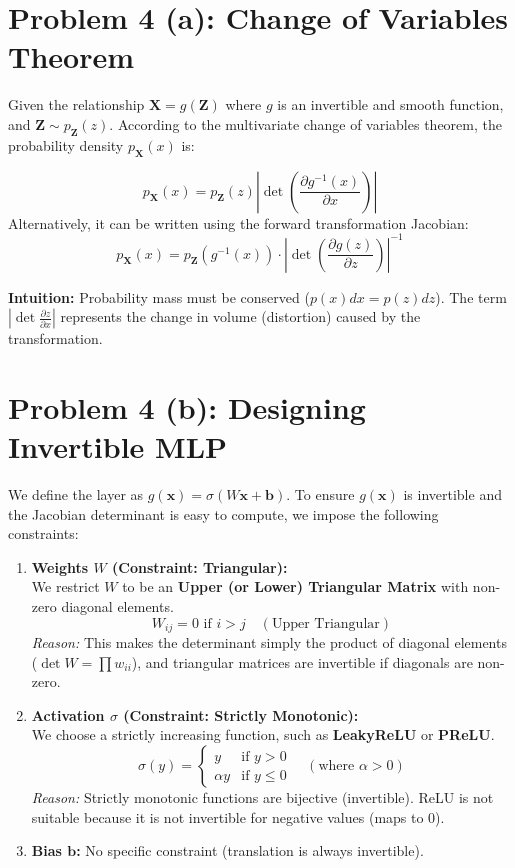 \documentclass[12pt]{article}
\begin{document}
\section*{Problem 4 (a): Change of Variables Theorem}

Given the relationship $\mathbf{X} = g(\mathbf{Z})$ where $g$ is an invertible and smooth function, and $\mathbf{Z} \sim p_{\mathbf{Z}}(z)$.
According to the multivariate change of variables theorem, the probability density $p_{\mathbf{X}}(x)$ is:

\[
    p_{\mathbf{X}}(x) = p_{\mathbf{Z}}(z) \left| \det \left( \frac{\partial g^{-1}(x)}{\partial x} \right) \right|
\]
Alternatively, it can be written using the forward transformation Jacobian:
\[
    p_{\mathbf{X}}(x) = p_{\mathbf{Z}}(g^{-1}(x)) \cdot \left| \det \left( \frac{\partial g(z)}{\partial z} \right) \right|^{-1}
\]

\textbf{Intuition:}
Probability mass must be conserved ($p(x)dx = p(z)dz$). The term $\left| \det \frac{\partial z}{\partial x} \right|$ represents the change in volume (distortion) caused by the transformation.

\section*{Problem 4 (b): Designing Invertible MLP}

We define the layer as $g(\mathbf{x}) = \sigma(W\mathbf{x} + \mathbf{b})$. To ensure $g(\mathbf{x})$ is invertible and the Jacobian determinant is easy to compute, we impose the following constraints:

\begin{enumerate}
    \item \textbf{Weights $W$ (Constraint: Triangular):} \\
    We restrict $W$ to be an \textbf{Upper (or Lower) Triangular Matrix} with non-zero diagonal elements.
    \[
        W_{ij} = 0 \text{ if } i > j \quad (\text{Upper Triangular})
    \]
    \textit{Reason:} This makes the determinant simply the product of diagonal elements ($\det W = \prod w_{ii}$), and triangular matrices are invertible if diagonals are non-zero.

    \item \textbf{Activation $\sigma$ (Constraint: Strictly Monotonic):} \\
    We choose a strictly increasing function, such as \textbf{LeakyReLU} or \textbf{PReLU}.
    \[
        \sigma(y) = \begin{cases} y & \text{if } y > 0 \\ \alpha y & \text{if } y \le 0 \end{cases} \quad (\text{where } \alpha > 0)
    \]
    \textit{Reason:} Strictly monotonic functions are bijective (invertible). ReLU is not suitable because it is not invertible for negative values (maps to 0).
    
    \item \textbf{Bias $\mathbf{b}$:} No specific constraint (translation is always invertible).
\end{enumerate}
\end{document}
